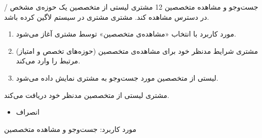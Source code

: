
{
\usecase
{جست‌وجو و مشاهده متخصصین}
{12}
{
	مشتری لیستی از متخصصین یک حوزه‌ی مشخص / در دسترس مشاهده کند.
}
{مشتری}
{}
{
	مشتری در سیستم لاگین کرده باشد.
}
{
	\vspace*{-0.6cm}
	\begin{enumerate}
		\item 
		مورد کاربرد با انتخاب «مشاهده‌ی متخصصین» توسط مشتری آغاز می‌شود.
		\item 
		مشتری شرایط مدنظر خود برای مشاهده‌ی متخصصین (حوزه‌های تخصص و امتیاز) مرتبط را وارد می‌کند.
		\item 
		لیستی از متخصصین مورد جست‌وجو به مشتری نمایش داده می‌شود.
	\end{enumerate}
}
{مشتری لیستی از متخصصین مدنظر خود دریافت می‌کند.}
{
	\begin{itemize}
		\vspace*{-0.6cm}
		\item انصراف
	\end{itemize}
}
{
	مورد کاربرد: جست‌وجو و مشاهده متخصصین
}

}

